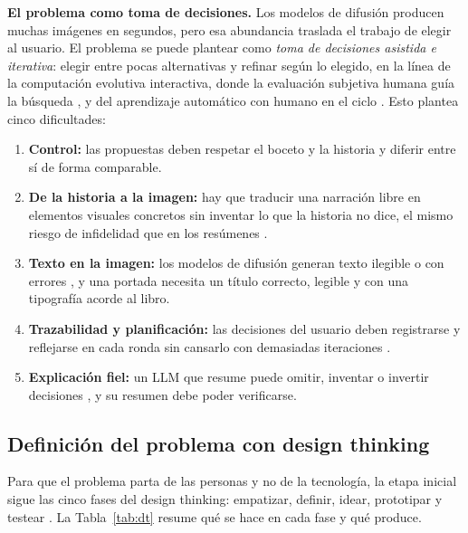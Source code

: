 \documentclass[10pt,a4paper,twocolumn]{article}
\begin{document}
\textbf{El problema como toma de decisiones.} Los modelos de difusión \citep{ho2020,rombach2022} producen muchas imágenes en segundos, pero esa abundancia traslada el trabajo de elegir al usuario. El problema se puede plantear como \emph{toma de decisiones asistida e iterativa}: elegir entre pocas alternativas y refinar según lo elegido, en la línea de la computación evolutiva interactiva, donde la evaluación subjetiva humana guía la búsqueda \citep{takagi2001,secretan2008}, y del aprendizaje automático con humano en el ciclo \citep{mosqueira2023}. Esto plantea cinco dificultades:
\begin{enumerate}
\item \textbf{Control:} las propuestas deben respetar el boceto y la historia y diferir entre sí de forma comparable.
\item \textbf{De la historia a la imagen:} hay que traducir una narración libre en elementos visuales concretos sin inventar lo que la historia no dice, el mismo riesgo de infidelidad que en los resúmenes \citep{maynez2020}.
\item \textbf{Texto en la imagen:} los modelos de difusión generan texto ilegible o con errores \citep{chen2023textdiffuser}, y una portada necesita un título correcto, legible y con una tipografía acorde al libro.
\item \textbf{Trazabilidad y planificación:} las decisiones del usuario deben registrarse y reflejarse en cada ronda sin cansarlo con demasiadas iteraciones \citep{takagi2001}.
\item \textbf{Explicación fiel:} un LLM que resume puede omitir, inventar o invertir decisiones \citep{maynez2020}, y su resumen debe poder verificarse.
\end{enumerate}
\subsection{Definición del problema con design thinking}\label{sec:dt}
Para que el problema parta de las personas y no de la tecnología, la etapa inicial sigue las cinco fases del design thinking: empatizar, definir, idear, prototipar y testear \citep{brown2008,dschool2010}. La Tabla~\ref{tab:dt} resume qué se hace en cada fase y qué produce.
\end{document}
